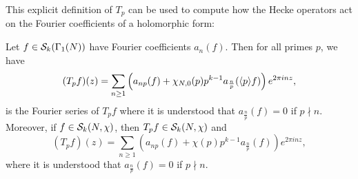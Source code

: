     This explicit definition of $T_{p}$ can be used to compute how the Hecke operators act on the Fourier coefficients of a holomorphic form:

    \begin{proposition}\label{prop:prime_Hecke_operators_acting_on_Fourier_coefficients_holomorphic}
      Let $f \in \mathcal{S}_{k}(\Gamma_{1}(N))$ have Fourier coefficients $a_{n}(f)$. Then for all primes $p$, we have
      \[
        (T_{p}f)(z) = \sum_{n \ge 1}\left(a_{np}(f)+\chi_{N,0}(p)p^{k-1}a_{\frac{n}{p}}(\langle p\rangle f)\right)e^{2\pi inz},
      \]
      is the Fourier series of $T_{p}f$ where it is understood that $a_{\frac{n}{p}}(f) = 0$ if $p \nmid n$. Moreover, if $f \in \mathcal{S}_{k}(N,\chi)$, then $T_{p}f \in \mathcal{S}_{k}(N,\chi)$ and
      \[
        (T_{p}f)(z) = \sum_{n \ge 1}\left(a_{np}(f)+\chi(p)p^{k-1}a_{\frac{n}{p}}(f)\right)e^{2\pi inz},
      \]
      where it is understood that $a_{\frac{n}{p}}(f) = 0$ if $p \nmid n$.
    \end{proposition}
